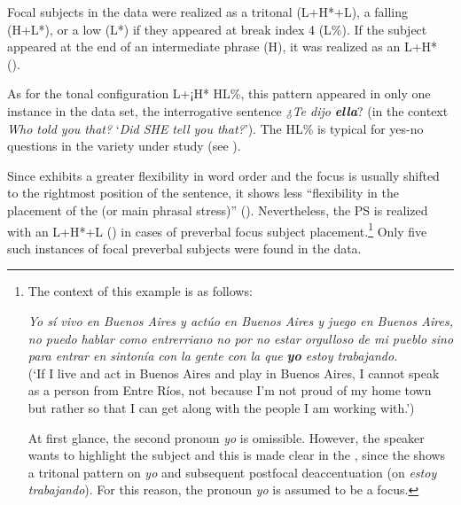 \documentclass[output=paper]{langsci/langscibook}
\begin{document}
Focal subjects in the data were realized as a tritonal (L+H*+L), a falling (H+L*), or a low (L*)  if they appeared at break index 4 (L\%). If the subject appeared at the end of an intermediate phrase (H\textminus{}), it was realized as an L+H* ().

As for the tonal configuration L+¡H* HL\%, this pattern appeared in only one instance in the data set, the interrogative sentence \textit{¿Te dijo} \textbf{\textit{ella}}? (in the context \textit{Who told you that?} ‘\textit{Did SHE} \textit{tell you that?}’). The  HL\% is typical for yes-no questions in the variety under study (see \citealt{Gabriel2010incollection}).

Since  exhibits a greater flexibility in word order and the focus is usually shifted to the rightmost position of the sentence, it shows less ``flexibility in the placement of the  (or main phrasal stress)'' (\citealt[358]{Hualde2015}). Nevertheless, the PS is realized with an L+H*+L () in cases of preverbal focus subject placement.\footnote{The context of this example is as follows:

\begin{exe}
\textit{Yo sí vivo en Buenos Aires y actúo en Buenos Aires y juego en Buenos Aires, no puedo hablar como entrerriano no por no estar orgulloso de mi pueblo sino para entrar en sintonía con la gente con la que \textbf{yo} estoy trabajando.}\\
(‘If I live and act in Buenos Aires and play in Buenos Aires, I cannot speak as a person from Entre Ríos, not because I’m not proud of my home town but rather so that I can get along with the people I am working with.’)
\end{exe}

At first glance, the second pronoun \textit{yo} is omissible. However, the speaker wants to highlight the subject and this is made clear in the , since the  shows a tritonal pattern on \textit{yo} and subsequent postfocal deaccentuation (on \textit{estoy trabajando}). For this reason, the pronoun \textit{yo} is assumed to be a focus.} Only five such instances of focal preverbal subjects were found in the data. 
\end{document}
